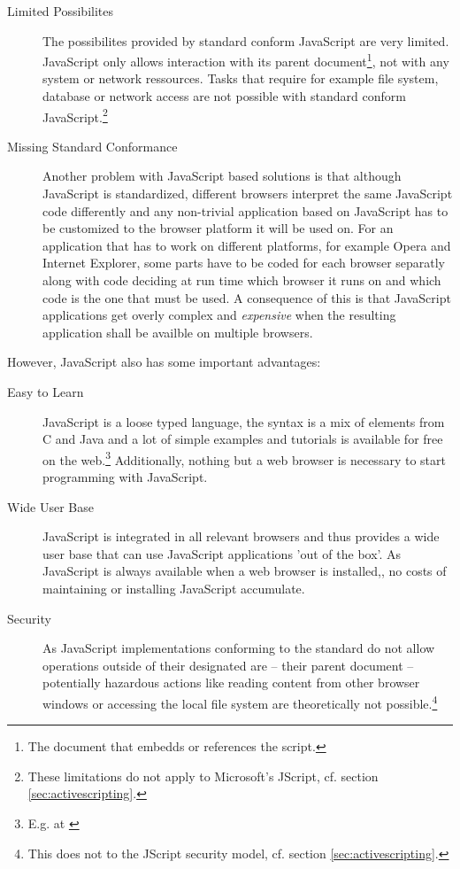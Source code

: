 \begin{description}
	\item[Limited Possibilites] The possibilites provided by standard conform JavaScript are very limited. Java\-Script only allows interaction with its parent document\footnote{The document that embedds or references the script.}, not with any system or network ressources. Tasks that require for example file system, database or network access are not possible with standard conform JavaScript.\footnote{These limitations do not apply to Microsoft's JScript, cf. section \ref{sec:activescripting}.} 
	\item[Missing Standard Conformance] Another problem with Java\-Script based solutions is that although Java\-Script is standardized, different browsers interpret the same JavaScript code differently and any non-trivial application based on JavaScript has to be customized to the browser platform it will be used on. For an application that has to work on different platforms, for example Opera and Internet Explorer, some parts have to be coded for each browser separatly along with code deciding at run time which browser it runs on and which code is the one that must be used. A consequence of this is that JavaScript applications get overly complex and \emph{expensive} when the resulting application shall be availble on multiple browsers.
\end{description}

However, JavaScript also has some important advantages:
\begin{description}
	
	\item [Easy to Learn] JavaScript is a loose typed language, the syntax is a mix of elements from C and Java and a lot of simple examples and tutorials is available for free on the web.\footnote{E.g. at \cite{W3SchJS}} Additionally, nothing but a web browser is necessary to start programming with JavaScript.
	
	\item [Wide User Base] JavaScript is integrated in all relevant browsers and thus provides a wide user base that can use JavaScript applications 'out of the box'. As JavaScript is always available when a web browser is installed,, no costs of maintaining or installing JavaScript accumulate.
	
	\item [Security] As JavaScript implementations conforming to the standard do not allow operations outside of their designated are -- their parent document -- potentially hazardous actions like reading content from other browser windows or accessing the local file system are theoretically not possible.\footnote{This does not to the JScript security model, cf. section \ref{sec:activescripting}.}
	
\end{description}